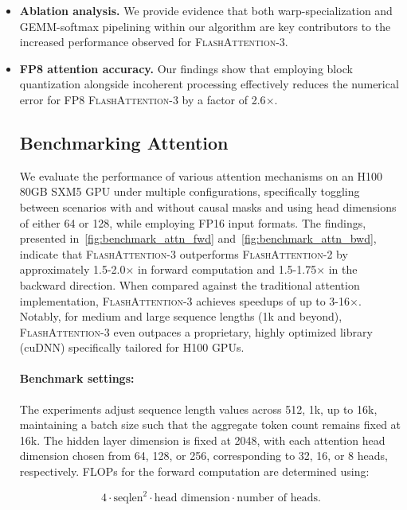 \begin{algorithm}[H]
\begin{algorithmic}[1]
\begin{itemize}
\item \textbf{Ablation analysis.} We provide evidence that both warp-specialization and GEMM-softmax pipelining within our algorithm are key contributors to the increased performance observed for \textsc{FlashAttention-3}.

\item \textbf{FP8 attention accuracy.} Our findings show that employing block quantization alongside incoherent processing effectively reduces the numerical error for FP8 \textsc{FlashAttention-3} by a factor of 2.6$\times$.

\subsection{Benchmarking Attention}
\label{subsec:benchmark_attn}

We evaluate the performance of various attention mechanisms on an H100 80GB SXM5 GPU under multiple configurations, specifically toggling between scenarios with and without causal masks and using head dimensions of either 64 or 128, while employing FP16 input formats. The findings, presented in~\cref{fig:benchmark_attn_fwd} and~\cref{fig:benchmark_attn_bwd}, indicate that \textsc{FlashAttention-3} outperforms \textsc{FlashAttention-2} by approximately 1.5-2.0$\times$ in forward computation and 1.5-1.75$\times$ in the backward direction. When compared against the traditional attention implementation, \textsc{FlashAttention-3} achieves speedups of up to 3-16$\times$. Notably, for medium and large sequence lengths (1k and beyond), \textsc{FlashAttention-3} even outpaces a proprietary, highly optimized library (cuDNN) specifically tailored for H100 GPUs.

\paragraph{Benchmark settings:} The experiments adjust sequence length values across 512, 1k, up to 16k, maintaining a batch size such that the aggregate token count remains fixed at 16k. The hidden layer dimension is fixed at 2048, with each attention head dimension chosen from 64, 128, or 256, corresponding to 32, 16, or 8 heads, respectively. FLOPs for the forward computation are determined using:

\begin{equation*}
  4 \cdot \text{seqlen}^2 \cdot \text{head dimension} \cdot \text{number of heads}.
\end{equation*}


\end{itemize}
\end{algorithmic}
\end{algorithm}
